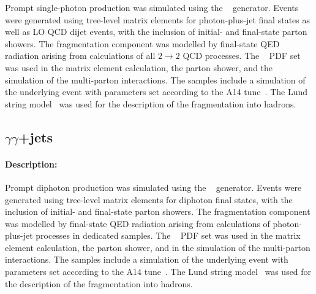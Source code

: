 Prompt single-photon production was simulated using the \PYTHIA[8.186]~\cite{Sjostrand:2007gs} generator. 
Events were generated using tree-level matrix elements for photon-plus-jet final
states as well as LO QCD dijet events, with the inclusion of initial-
and final-state parton showers. The fragmentation component was
modelled by final-state QED radiation arising from calculations of all
$2\rightarrow 2$ QCD processes. The \NNPDF[2.3lo]~\cite{Ball:2012cx} PDF
set was used in the matrix element calculation, the parton shower, and
the simulation of the multi-parton interactions. The samples
include a simulation of the underlying event with parameters set
according to the A14 tune~\cite{ATL-PHYS-PUB-2014-021}. The Lund
string model~\cite{Andersson:1983ia,Sjostrand:1984ic} was used for the
description of the fragmentation into hadrons.


\subsection[yy+jets]{ $\gamma\gamma$+jets}

\paragraph{Description:}

Prompt diphoton production was simulated using the 
\PYTHIA[8.186]~\cite{Sjostrand:2007gs} generator. Events were 
generated using tree-level matrix elements for diphoton final states,
with the inclusion of initial- and final-state parton showers.  The
fragmentation component was modelled by final-state QED radiation
arising from calculations of photon-plus-jet processes in dedicated
samples. The \NNPDF[2.3lo]~\cite{Ball:2012cx} PDF set was used in the
matrix element calculation, the parton shower, and in the simulation of the
multi-parton interactions. The samples include a simulation of the
underlying event with parameters set according to the A14
tune~\cite{ATL-PHYS-PUB-2014-021}. The Lund string
model~\cite{Andersson:1983ia,Sjostrand:1984ic} was used for the
description of the fragmentation into hadrons.
